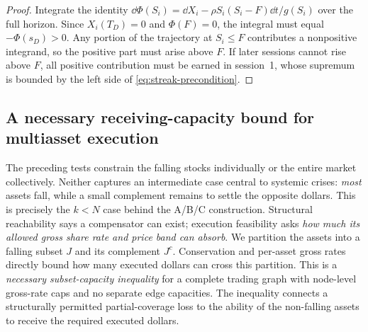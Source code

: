 \documentclass[review,hidelinks,onefignum,onetabnum]{siamonline250211}
\begin{document}
\begin{proof}
Integrate the identity $\dd\Phi(S_i)=\dd X_i-\rho S_i(S_i-F)\dd t/g(S_i)$ over the full horizon. Since $X_i(T_D)=0$ and $\Phi(F)=0$, the integral must equal $-\Phi(s_D)>0$. Any portion of the trajectory at $S_i\le F$ contributes a nonpositive integrand, so the positive part must arise above $F$. If later sessions cannot rise above $F$, all positive contribution must be earned in session~1, whose supremum is bounded by the left side of \eqref{eq:streak-precondition}.
\end{proof}


\subsection{A necessary receiving-capacity bound for multiasset execution}\label{subsec:multiday-cut}
The preceding tests constrain the falling stocks individually or the entire market collectively. Neither captures an intermediate case central to systemic crises: \emph{most} assets fall, while a small complement remains to settle the opposite dollars. This is precisely the $k<N$ case behind the A/B/C construction. Structural reachability says a compensator can exist; execution feasibility asks \emph{how much its allowed gross share rate and price band can absorb}. We partition the assets into a falling subset $J$ and its complement $J^c$. Conservation and per-asset gross rates directly bound how many executed dollars can cross this partition. This is a \emph{necessary subset-capacity inequality} for a complete trading graph with node-level gross-rate caps and no separate edge capacities. The inequality connects a structurally permitted partial-coverage loss to the ability of the non-falling assets to receive the required executed dollars.
\end{document}
